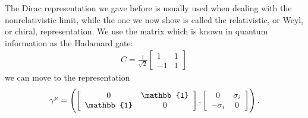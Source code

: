 \documentclass[main.tex]{subfiles}
\begin{document}
The Dirac representation we gave before is usually used when dealing with the nonrelativistic limit, while the one we now show is called the relativistic, or Weyl, or chiral, representation. 
We use the matrix which is known in quantum information as the Hadamard gate:
%
\begin{subequations}
\begin{align}
C = \frac{1}{\sqrt{2}} \left[\begin{array}{cc}
1 & 1 \\ 
-1 & 1
\end{array}\right]
\,
\end{align}
\end{subequations}
%
we can move to the representation 
%
\begin{subequations}
\begin{align}
\gamma^{\mu } = \qty(\left[\begin{array}{cc}
0 & \mathbb{1} \\ 
\mathbb{1} & 0
\end{array}\right], \left[\begin{array}{cc}
0 & \sigma_{i} \\ 
- \sigma_{i} & 0
\end{array}\right])
\,.
\end{align}
\end{subequations}
%
\end{document}
